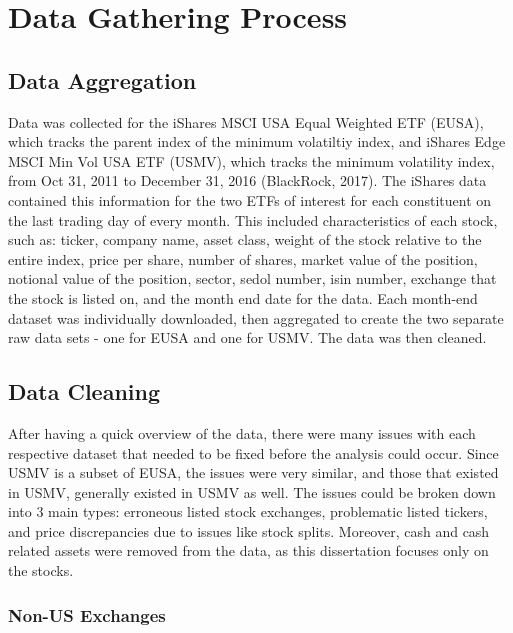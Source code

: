 \documentclass[12pt,twoside]{reedthesis}
\theoremstyle{definition}
\theoremstyle{definition}
\theoremstyle{definition}
\theoremstyle{remark}
\begin{document}
\chapter{Data Gathering Process}\label{data-gathering-process}

\section{Data Aggregation}\label{data-aggregation}

Data was collected for the iShares MSCI USA Equal Weighted ETF (EUSA),
which tracks the parent index of the minimum volatiltiy index, and
iShares Edge MSCI Min Vol USA ETF (USMV), which tracks the minimum
volatility index, from Oct 31, 2011 to December 31, 2016 (BlackRock,
2017). The iShares data contained this information for the two ETFs of
interest for each constituent on the last trading day of every month.
This included characteristics of each stock, such as: ticker, company
name, asset class, weight of the stock relative to the entire index,
price per share, number of shares, market value of the position,
notional value of the position, sector, sedol number, isin number,
exchange that the stock is listed on, and the month end date for the
data. Each month-end dataset was individually downloaded, then
aggregated to create the two separate raw data sets - one for EUSA and
one for USMV. The data was then cleaned.

\section{Data Cleaning}\label{data-cleaning}

After having a quick overview of the data, there were many issues with
each respective dataset that needed to be fixed before the analysis
could occur. Since USMV is a subset of EUSA, the issues were very
similar, and those that existed in USMV, generally existed in USMV as
well. The issues could be broken down into 3 main types: erroneous
listed stock exchanges, problematic listed tickers, and price
discrepancies due to issues like stock splits. Moreover, cash and cash
related assets were removed from the data, as this dissertation focuses
only on the stocks.

\subsection{Non-US Exchanges}\label{non-us-exchanges}
\end{document}
